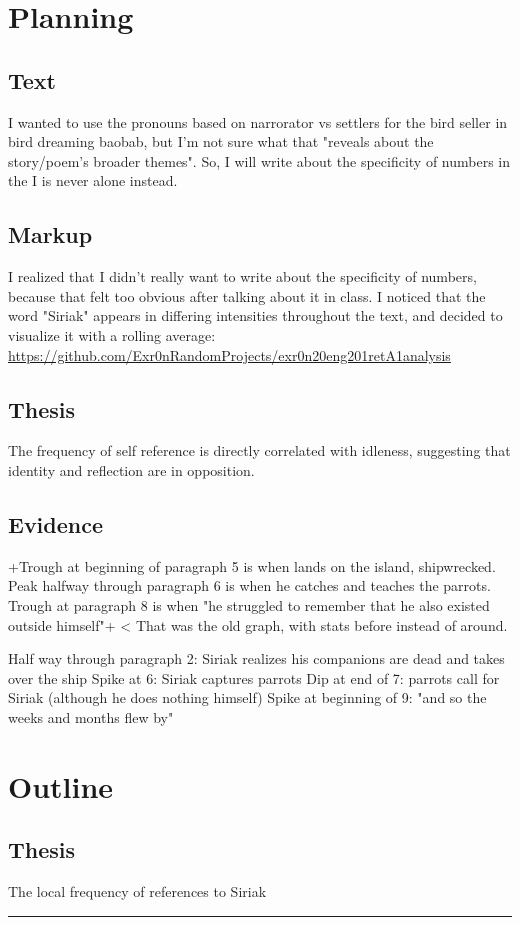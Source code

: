\documentclass[letterpaper]{article}
\begin{document}
\section{Planning}
\label{sec:orgee4fadc}
\subsection{Text}
\label{sec:org0c41bef}
I wanted to use the pronouns based on narrorator vs settlers for the
bird seller in bird dreaming baobab, but I'm not sure what that "reveals
about the story/poem's broader themes". So, I will write about the
specificity of numbers in the I is never alone instead.

\subsection{Markup}
\label{sec:orged57f19}
I realized that I didn't really want to write about the specificity of
numbers, because that felt too obvious after talking about it in class.
I noticed that the word "Siriak" appears in differing intensities
throughout the text, and decided to visualize it with a rolling average:
\url{https://github.com/Exr0nRandomProjects/exr0n20eng201retA1analysis}

\subsection{Thesis}
\label{sec:org3e1175b}
The frequency of self reference is directly correlated with idleness,
suggesting that identity and reflection are in opposition.

\subsection{Evidence}
\label{sec:orgae7a030}
+Trough at beginning of paragraph 5 is when lands on the island,
shipwrecked. Peak halfway through paragraph 6 is when he catches and
teaches the parrots. Trough at paragraph 8 is when "he struggled to
remember that he also existed outside himself"+ < That was the old
graph, with stats before instead of around.

Half way through paragraph 2: Siriak realizes his companions are dead
and takes over the ship Spike at 6: Siriak captures parrots Dip at end
of 7: parrots call for Siriak (although he does nothing himself) Spike
at beginning of 9: "and so the weeks and months flew by"

\section{Outline}
\label{sec:orge67c0e2}
\subsection{Thesis}
\label{sec:org7362caf}
The local frequency of references to Siriak

\noindent\rule{\textwidth}{0.5pt}
\end{document}
